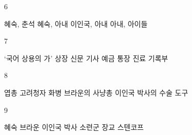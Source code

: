 \documentclass[fs9,seriesRus]{korfarm-base}
\begin{document}
\begin{kfSentenceUnit}{6}{}
\begin{kfChoices}
\kfChoice 혜숙, 춘석
\kfChoice 혜숙, 아내
\kfChoice 이인국, 아내
\kfChoice 아내, 아이들
\end{kfChoices}
\end{kfSentenceUnit}

\begin{kfSentenceUnit}{7}{}
\begin{kfChoices}
\kfChoice ‘국어 상용의 가’ 상장
\kfChoice 신문 기사
\kfChoice 예금 통장
\kfChoice 진료 기록부
\end{kfChoices}
\end{kfSentenceUnit}

\begin{kfSentenceUnit}{8}{}
\begin{kfChoices}
\kfChoice 엽총
\kfChoice 고려청자 화병
\kfChoice 브라운의 사냥총
\kfChoice 이인국 박사의 수술 도구
\end{kfChoices}
\end{kfSentenceUnit}

\begin{kfSentenceUnit}{9}{}
\begin{kfChoices}
\kfChoice 혜숙
\kfChoice 브라운
\kfChoice 이인국 박사
\kfChoice 소련군 장교 스텐코프
\end{kfChoices}
\end{kfSentenceUnit}

\kfEndMC
\end{document}
